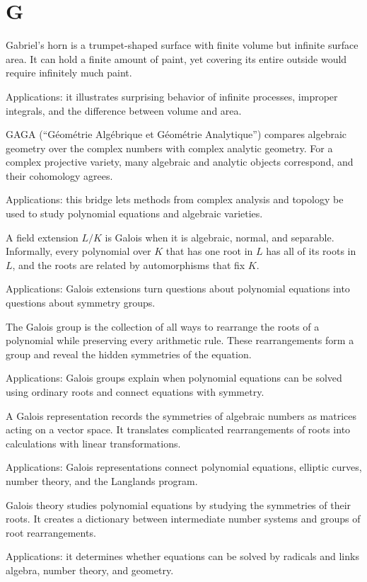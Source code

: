 \chapter*{G}
\label{chap:g}

Gabriel's horn is a trumpet-shaped surface with finite volume but infinite surface area. It can hold a finite amount of paint, yet covering its entire outside would require infinitely much paint. \par\noindent Applications: it illustrates surprising behavior of infinite processes, improper integrals, and the difference between volume and area.

GAGA (``Géométrie Algébrique et Géométrie Analytique'') compares algebraic geometry over the complex numbers with complex analytic geometry. For a complex projective variety, many algebraic and analytic objects correspond, and their cohomology agrees. \par\noindent Applications: this bridge lets methods from complex analysis and topology be used to study polynomial equations and algebraic varieties.

A field extension $L/K$ is Galois when it is algebraic, normal, and separable. Informally, every polynomial over $K$ that has one root in $L$ has all of its roots in $L$, and the roots are related by automorphisms that fix $K$. \par\noindent Applications: Galois extensions turn questions about polynomial equations into questions about symmetry groups.

The Galois group is the collection of all ways to rearrange the roots of a polynomial while preserving every arithmetic rule. These rearrangements form a group and reveal the hidden symmetries of the equation. \par\noindent Applications: Galois groups explain when polynomial equations can be solved using ordinary roots and connect equations with symmetry.

A Galois representation records the symmetries of algebraic numbers as matrices acting on a vector space. It translates complicated rearrangements of roots into calculations with linear transformations. \par\noindent Applications: Galois representations connect polynomial equations, elliptic curves, number theory, and the Langlands program.

Galois theory studies polynomial equations by studying the symmetries of their roots. It creates a dictionary between intermediate number systems and groups of root rearrangements. \par\noindent Applications: it determines whether equations can be solved by radicals and links algebra, number theory, and geometry.

